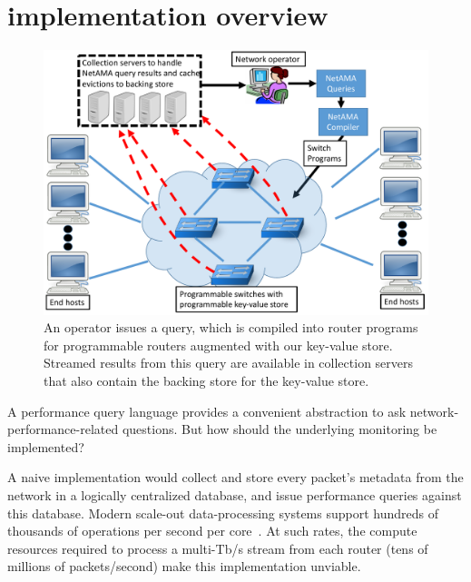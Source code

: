 \section{\TheSystem implementation overview}
\label{s:overview}
\begin{figure}[!t]
\centering
\includegraphics[width=0.7\columnwidth]{pq_overview.pdf}
\caption{An operator issues a \TheSystem query, which is compiled into
router programs for programmable routers augmented with our
key-value store. Streamed results from this query are available in
collection servers that also contain the backing store for the key-value
store.}
\label{fig:overview}
\end{figure}

A performance query language provides a convenient abstraction to ask
network-performance-related questions. But how should the underlying monitoring
be implemented?

A naive implementation would collect and store every packet's metadata
from the network in a logically centralized database, and issue performance
queries against this database. %
Modern scale-out data-processing systems support hundreds of thousands of
operations per second per core~\cite{kafka_benchmark, redis_benchmark,
  memcached_benchmark, redis_vs_memcached, redis_vs_memcached_update}. At such
rates, the compute resources required to process a multi-Tb/s stream from each
router (tens of millions of packets/second) make this implementation
unviable.

